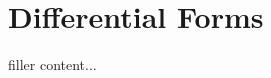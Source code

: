 \documentclass[../../templates/section]{subfiles}
\begin{document}
\section{Differential Forms}\label{sec:differential-forms}

filler content...
\end{document}
